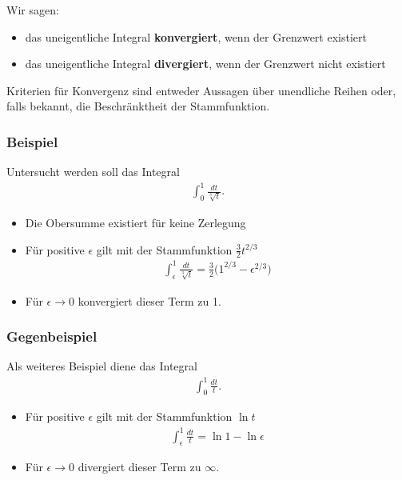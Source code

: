 \begin{frame}
    Wir sagen:
    \begin{itemize}
        \item das uneigentliche Integral \textbf{konvergiert}, wenn der Grenzwert existiert
        \item das uneigentliche Integral \textbf{divergiert}, wenn der Grenzwert nicht existiert
    \end{itemize}
    Kriterien für Konvergenz sind entweder Aussagen über unendliche Reihen oder, falls bekannt, die Beschränktheit der Stammfunktion.
\end{frame}


\begin{frame}
    \frametitle<presentation>{Beispiel}
    Untersucht werden soll das Integral
    \begin{gather*}
        \int_0^1 \frac{dt}{\sqrt[3]{t}}.
    \end{gather*}
    \begin{figure}[H]
      \centering
      \resizebox{0.8\linewidth}{!}{}
    \end{figure}
    \begin{itemize}
    \item Die Obersumme existiert für keine Zerlegung
    \item Für positive $\epsilon$ gilt mit der Stammfunktion $\frac32 t^{2/3}$
    \begin{gather*}
        \int_\epsilon^1 \frac{dt}{\sqrt[3]{t}}
        = \tfrac32 \bigl(1^{2/3} - \epsilon^{2/3}\bigr)
    \end{gather*}
    \item Für $\epsilon\to 0$ konvergiert dieser Term zu 1.
    \end{itemize}
\end{frame}

\begin{frame}
    \frametitle<presentation>{Gegenbeispiel}
    Als weiteres Beispiel diene das Integral
    \begin{gather*}
        \int_0^1 \frac{dt}{t}.
    \end{gather*}
    \begin{figure}[H]
      \centering
      \resizebox{0.8\linewidth}{!}{}
    \end{figure}
    \begin{itemize}
    \item Für positive $\epsilon$ gilt mit der Stammfunktion $\ln t$
    \begin{gather*}
        \int_\epsilon^1 \frac{dt}{t}
        = \ln 1 - \ln\epsilon
    \end{gather*}
    \item Für $\epsilon\to 0$ divergiert dieser Term zu $\infty$.
    \end{itemize}
\end{frame}

